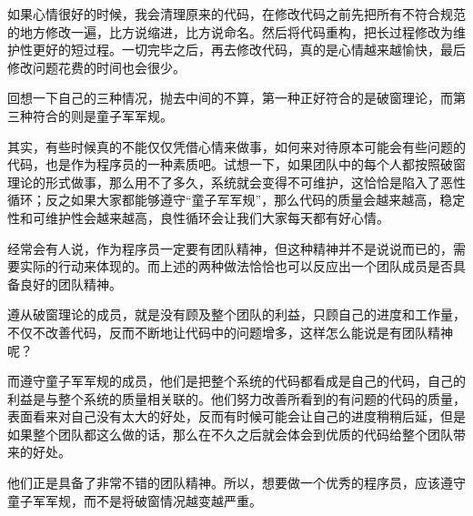 如果心情很好的时候，我会清理原来的代码，在修改代码之前先把所有不符合规范的地方修改一遍，比方说缩进，比方说命名。然后将代码重构，把长过程修改为维护性更好的短过程。一切完毕之后，再去修改代码，真的是心情越来越愉快，最后修改问题花费的时间也会很少。

回想一下自己的三种情况，抛去中间的不算，第一种正好符合的是破窗理论，而第三种符合的则是童子军军规。

其实，有些时候真的不能仅仅凭借心情来做事，如何来对待原本可能会有些问题的代码，也是作为程序员的一种素质吧。试想一下，如果团队中的每个人都按照破窗理论的形式做事，那么用不了多久，系统就会变得不可维护，这恰恰是陷入了恶性循环；反之如果大家都能够遵守“童子军军规”，那么代码的质量会越来越高，稳定性和可维护性会越来越高，良性循环会让我们大家每天都有好心情。

经常会有人说，作为程序员一定要有团队精神，但这种精神并不是说说而已的，需要实际的行动来体现的。而上述的两种做法恰恰也可以反应出一个团队成员是否具备良好的团队精神。

遵从破窗理论的成员，就是没有顾及整个团队的利益，只顾自己的进度和工作量，不仅不改善代码，反而不断地让代码中的问题增多，这样怎么能说是有团队精神呢？

而遵守童子军军规的成员，他们是把整个系统的代码都看成是自己的代码，自己的利益是与整个系统的质量相关联的。他们努力改善所看到的有问题的代码的质量，表面看来对自己没有太大的好处，反而有时候可能会让自己的进度稍稍后延，但是如果整个团队都这么做的话，那么在不久之后就会体会到优质的代码给整个团队带来的好处。

他们正是具备了非常不错的团队精神。所以，想要做一个优秀的程序员，应该遵守童子军军规，而不是将破窗情况越变越严重。



\clearpage